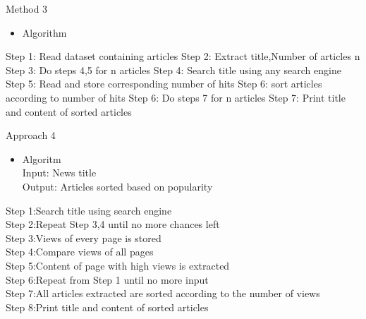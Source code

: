 \documentclass{beamer}
\begin{document}
	
	
	       
	
	\begin{frame}{Method 3}
		\begin{itemize}
			\item Algorithm
		\end{itemize}
		Step 1: Read dataset containing articles \newline
		Step 2: Extract title,Number of articles n \newline
		Step 3: Do steps 4,5 for n articles \newline
		Step 4: Search title using any search engine \newline
		Step 5: Read and store corresponding number of hits \newline
		Step 6: sort articles according to number of hits \newline
		Step 6: Do steps 7 for n articles \newline
		Step 7: Print title and content of sorted articles
		
	\end{frame}
	\begin{frame}{Approach 4}
		   \begin{itemize}
        	\item Algoritm\\
        	\footnotesize
        	Input: News title\\
        	Output: Articles sorted based on popularity \\  
   	   \end{itemize}	
            Step 1:Search title using search engine\\
            Step 2:Repeat Step 3,4 until no more chances left\\
            Step 3:Views of every page is stored\\
            Step 4:Compare views of all pages\\
            Step 5:Content of page with high views is extracted\\
            Step 6:Repeat from Step 1 until no more input\\
            Step 7:All articles extracted are sorted according to the number of views\\
            Step 8:Print title and content of sorted articles\\


	\end{frame}
\end{document}
